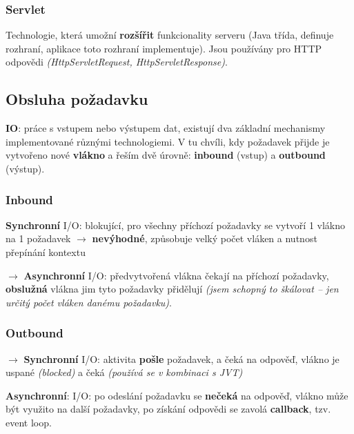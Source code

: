 \subsubsection*{Servlet}

Technologie, která umožní \textbf{rozšířit} funkcionality serveru (Java třída, definuje rozhraní, aplikace toto rozhraní implementuje). Jsou používány pro HTTP odpovědi \textit{(HttpServletRequest, HttpServletResponse)}.

\subsection{Obsluha požadavku}

\textbf{IO}: práce s vstupem nebo výstupem dat, existují dva základní mechanismy implementované různými technologiemi. V tu chvíli, kdy požadavek přijde je vytvořeno nové \textbf{vlákno} a řeším dvě úrovně: \textbf{inbound} (vstup) a \textbf{outbound} (výstup).


\subsubsection*{Inbound}

\vspace{4pt}
\noindent \textbf{Synchronní} I/O: blokující, pro všechny příchozí požadavky se vytvoří 1 vlákno na 1 požadavek $\to$ \textbf{nevýhodné}, způsobuje velký počet vláken a nutnost přepínání kontextu

\vspace{4pt}
\noindent $\to$ \textbf{Asynchronní} I/O: předvytvořená vlákna čekají na příchozí požadavky, \textbf{obslužná} vlákna jim tyto požadavky přidělují \textit{(jsem schopný to škálovat -- jen určitý počet vláken danému požadavku)}.

\subsubsection*{Outbound}

\vspace{4pt}
\noindent $\to$ \textbf{Synchronní} I/O: aktivita \textbf{pošle} požadavek, a čeká na odpověď, vlákno je uspané \textit{(blocked)} a čeká \textit{(používá se v kombinaci s JVT)}

\vspace{4pt}
\noindent \textbf{Asynchronní}: I/O: po odeslání požadavku se \textbf{nečeká} na odpověď, vlákno může být využito na další požadavky, po získání odpovědi se zavolá \textbf{callback}, tzv. event loop.

